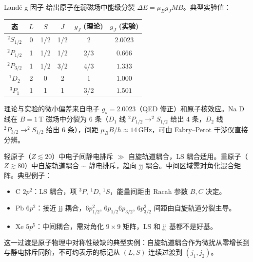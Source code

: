 Land\'e g 因子 给出原子在弱磁场中能级分裂 $\Delta E=\mu_B g_J M B$。典型实验值：
\begin{center}
\begin{tabular}{cccccc}
\hline
态 & $L$ & $S$ & $J$ & $g_J$ (理论) & $g_J$ (实验) \\
\hline
$^2S_{1/2}$ & 0 & 1/2 & 1/2 & 2 & $2.0023$ \\
$^2P_{1/2}$ & 1 & 1/2 & 1/2 & 2/3 & $0.666$ \\
$^2P_{3/2}$ & 1 & 1/2 & 3/2 & 4/3 & $1.333$ \\
$^1D_2$ & 2 & 0 & 2 & 1 & $1.000$ \\
$^3P_1$ & 1 & 1 & 1 & 3/2 & $1.501$ \\
\hline
\end{tabular}
\end{center}
理论与实验的微小偏差来自电子 $g_s=2.0023$（QED 修正）和原子核效应。Na D 线在 $B=1\,\mathrm{T}$ 磁场中分裂为 6 条（$D_1$ 线 $^2P_{1/2}\to^2S_{1/2}$ 给出 4 条，$D_2$ 线 $^2P_{3/2}\to^2S_{1/2}$ 给出 6 条），间距 $\mu_B B/h\approx14\,\mathrm{GHz}$，可由 Fabry--Perot 干涉仪直接分辨。

轻原子（$Z\lesssim20$）中电子间静电排斥 $\gg$ 自旋轨道耦合，LS 耦合适用。重原子（$Z\gtrsim80$）中自旋轨道耦合 $\sim$ 静电排斥，趋向 jj 耦合。中间区域需对角化混合矩阵。典型例子：
\begin{itemize}
 \item C $2p^2$：LS 耦合，项 $^3P$, $^1D$, $^1S$，能量间距由 Racah 参数 $B,C$ 决定。
 \item Pb $6p^2$：接近 jj 耦合，$6p_{1/2}^2$, $6p_{1/2}6p_{3/2}$, $6p_{3/2}^2$ 间距由自旋轨道分裂主导。
 \item Xe $5p^5$：中间耦合，需对角化 $9\times9$ 矩阵，LS 和 jj 基都不是好基。
\end{itemize}
这一过渡是原子物理中对称性破缺的典型实例：自旋轨道耦合作为微扰从零增长到与静电排斥同阶，不可约表示的标记从 $(L,S)$ 连续过渡到 $(j_1,j_2)$。

